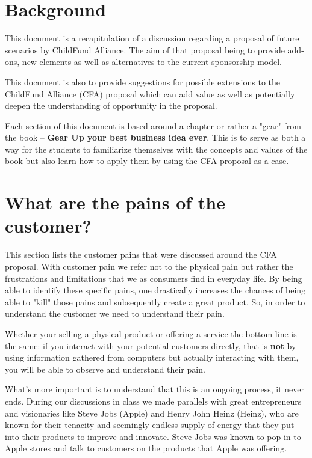 \section{Background}
This document is a recapitulation of a discussion regarding a proposal of future scenarios by ChildFund Alliance. The aim of that proposal being to provide add-ons, new elements as well as alternatives to the current sponsorship model.

This document is also to provide suggestions for possible extensions to the ChildFund Alliance (CFA) proposal which can add value as well as potentially deepen the understanding of opportunity in the proposal.

Each section of this document is based around a chapter or rather a "gear" from the book – \textbf{Gear Up your best business idea ever}. This is to serve as both a way for the students to familiarize themselves with the concepts and values of the book but also learn how to apply them by using the CFA proposal as a case.

\section{What are the pains of the customer?} %
\label{sec:what_are_the_pains_of_the_customer_}
This section lists the customer pains that were discussed around the CFA proposal. With customer pain we refer not to the physical pain but rather the frustrations and limitations that we as consumers find in everyday life. By being able to identify these specific pains, one drastically increases the chances of being able to "kill" those pains and subsequently create a great product. So, in order to understand the customer we need to understand their pain.

Whether your selling a physical product or offering a service the bottom line is the same: if you interact with your potential customers directly, that is \textbf{not} by using information gathered from computers but actually interacting with them, you will be able to observe and understand their pain.

What's more important is to understand that this is an ongoing process, it never ends. During our discussions in class we made parallels with great entrepreneurs and visionaries like Steve Jobs (Apple) and Henry John Heinz (Heinz), who are known for their tenacity and seemingly endless supply of energy that they put into their products to improve and innovate. Steve Jobs was known to pop in to Apple stores and talk to customers on the products that Apple was offering.

